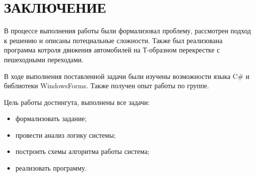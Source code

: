 \section*{ЗАКЛЮЧЕНИЕ}
В процессе выполнения работы были формализовал проблему, рассмотрен подход к решению и описаны потециальные сложности. Также был реализована программа котроля движения автомобилей на Т-образном перекрестке с пешеходными переходами.

В ходе выполнения поставленной задачи были изучены возможности языка C\# и библиотеки WindowsForms. Также получен опыт работы по группе.

Цель работы достингута, выполнены все задачи:
\begin{itemize}
    \item формализовать задание;
    \item провести анализ логику системы;
    \item построить схемы алгоритма работы система;
    \item реализовать программу.
\end{itemize}